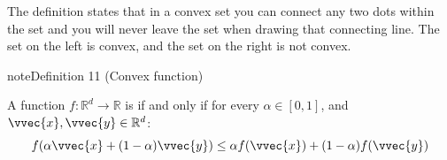 \documentclass[letterpaper,10pt,english]{jupyterBook}
\begin{document}
\sphinxAtStartPar
The definition states that in a convex set you can connect any two dots within the set and you will never leave the set when drawing that connecting line. The set on the left is convex, and the set on the right is not convex.
\begin{center}\end{center}\label{optimization_convex:convex_function}
\begin{sphinxadmonition}{note}{Definition 11 (Convex function)}



\sphinxAtStartPar
A function \(f:\mathbb{R}^d\rightarrow\mathbb{R}\) is  if and only if for every \(\alpha \in[0,1]\), and \(\vvec{x},\vvec{y}\in\mathbb{R}^d\):
\label{equation:optimization_convex:c259b614-12b7-4862-8812-f9d2e7a632cf}\begin{equation}
 f(\alpha \vvec{x}+ (1-\alpha)\vvec{y})\leq\alpha f(\vvec{x})+(1-\alpha)f(\vvec{y})\nonumber
\end{equation}\end{sphinxadmonition}
\end{document}
